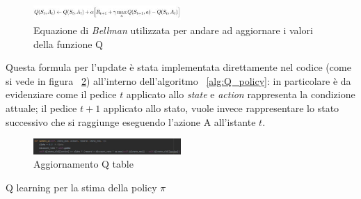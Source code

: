 \begin{figure}[!h]
	\centering
	\includegraphics[width=0.5\textwidth]{Immagini/Q_estimation.JPG}
	\caption{Equazione di \textit{Bellman} utilizzata per andare ad aggiornare i valori della funzione Q}
	\label{fig:Q_estimation}
\end{figure}

Questa formula per l'update è stata implementata direttamente nel codice (come si vede in figura ~\ref{fig:Q_update}) all'interno dell'algoritmo ~\ref{alg:Q_policy}: in particolare è da evidenziare come il pedice $t$ applicato allo \textit{state} e \textit{action} rappresenta la condizione attuale; il pedice $t+1$ applicato allo stato, vuole invece rappresentare lo stato successivo che si raggiunge eseguendo l'azione A all'istante $t$.

\begin{figure}[!h]
	\centering
	\includegraphics[width=0.5\textwidth]{Immagini/Q_update.JPG}
	\caption{Aggiornamento Q table}
	\label{fig:Q_update}
\end{figure}

\begin{algorithm}
		\SetAlgoLined
		\caption{Q learning per la stima della policy $\pi$}
		\label{alg:Q_policy}
\end{algorithm}

